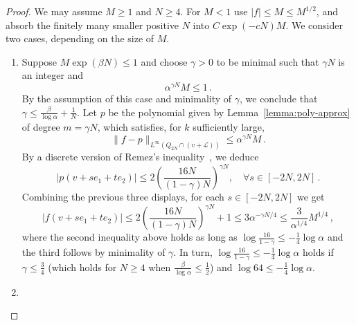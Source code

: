 \documentclass{daj}
\begin{document}
\begin{proof}
	We may assume $M\geq1$ and $N\geq4$. For $M<1$ use $|f|\leq M\leq M^{1/2}$, and absorb the finitely many smaller positive $N$ into $C\exp(-cN)M$. We consider two cases, depending on the size of $M$.
	\begin{enumerate}
		\item
		Suppose $M\exp(\beta N) \leq 1$ and choose $\gamma > 0$ to be minimal such that $\gamma N$ is an integer and
		\begin{equation*}
			\alpha^{\gamma N}M \leq 1 \, .
		\end{equation*}
		By the assumption of this case and minimality of $\gamma$, we conclude that $\gamma \leq \frac{\beta}{\log \alpha} + \frac{1}{N}$.
		Let $p$ be the polynomial given by Lemma~\ref{lemma:poly-approx} of degree $m=\gamma N$, which satisfies, for $k$ sufficiently large,
		\begin{equation*}
			\|f-p\|_{L^\infty(Q_{2N} \cap (v + \mathcal{L}))} \leq \alpha^{\gamma N}M \, .
		\end{equation*}
		By a discrete version of Remez's inequality~\cite[Corollary~2.2]{buhovsky2022discrete}, we deduce
		\begin{equation*}
			|p(v + se_1 + te_2)| \leq 2{\left(\frac{16N}{(1-\gamma)N}\right)}^{\gamma N}, \quad \forall s \in [-2N, 2N] \, .
		\end{equation*}
		Combining the previous three displays, for each $s \in [-2N, 2N]$ we get
		\begin{equation*}
			|f(v + se_1 + te_2)| \leq 2{\left(\frac{16N}{(1-\gamma)N}\right)}^{\gamma N} + 1 \leq 3 \alpha^{-\gamma N/4} \leq \frac{3}{\alpha^{1/4}} M^{1/4} \, ,
		\end{equation*}
		where the second inequality above holds as long as $\log \frac{16}{1 - \gamma} \leq -\frac{1}{4}\log \alpha$ and the third follows by minimality of $\gamma$. In turn, $\log \frac{16}{1 - \gamma} \leq -\frac{1}{4}\log \alpha$ holds if $\gamma \leq \frac{3}{4}$ (which holds for $N \geq 4$ when $\frac{\beta}{\log \alpha} \leq \frac12$) and $\log 64 \leq -\frac{1}{4} \log \alpha$.
		\item
		

\end{enumerate}
\end{proof}
\end{document}
